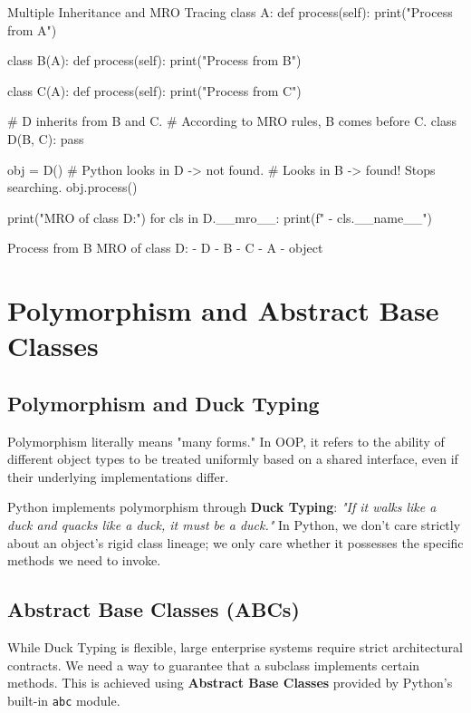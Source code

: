 \begin{pythoncode}{Multiple Inheritance and MRO Tracing}
class A:
    def process(self): print("Process from A")

class B(A):
    def process(self): print("Process from B")

class C(A):
    def process(self): print("Process from C")

# D inherits from B and C. 
# According to MRO rules, B comes before C.
class D(B, C):
    pass

obj = D()
# Python looks in D -> not found. 
# Looks in B -> found! Stops searching.
obj.process() 

print("MRO of class D:")
for cls in D.__mro__:
    print(f" - {cls.__name__}")
\end{pythoncode}

\begin{outputbox}
Process from B
MRO of class D:
 - D
 - B
 - C
 - A
 - object
\end{outputbox}

\section{Polymorphism and Abstract Base Classes}

\subsection{Polymorphism and Duck Typing}
Polymorphism literally means "many forms." In OOP, it refers to the ability of different object types to be treated uniformly based on a shared interface, even if their underlying implementations differ. 

Python implements polymorphism through \textbf{Duck Typing}: \textit{"If it walks like a duck and quacks like a duck, it must be a duck."} In Python, we don't care strictly about an object's rigid class lineage; we only care whether it possesses the specific methods we need to invoke.

\subsection{Abstract Base Classes (ABCs)}
While Duck Typing is flexible, large enterprise systems require strict architectural contracts. We need a way to guarantee that a subclass implements certain methods. This is achieved using \textbf{Abstract Base Classes} provided by Python's built-in \texttt{abc} module.

